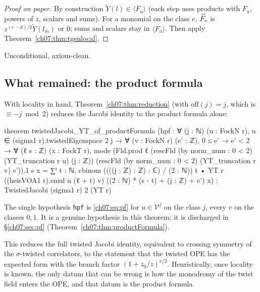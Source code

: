 \begin{proof}[Proof on paper]
By construction $\widetilde Y(l)\in\langle F_a\rangle$ (each step uses products with $F_a$, powers
of $z$, scalars and sums). For a monomial on the class $e$, $\widetilde{F}_e$ is $z^{(e-d)/2}
\widetilde Y(l_m)$ or $0$; sums and scalars stay in $\langle F_a\rangle$. Then apply
Theorem~\ref{ch07:thm:tgenlocal}.
\end{proof}

\begin{status}
Unconditional, axiom-clean.
\end{status}

\subsection{What remained: the product formula}

With locality in hand, Theorem~\ref{ch07:thm:reduction} (with $\mathrm{off}(j) = j$, which is
$\equiv -j \bmod 2$) reduces the Jacobi identity to the product formula alone:

\begin{leancode}
theorem twistedJacobi_YT_of_productFormula
    (hpf : ∀ (j : ℕ) (u : FockN r), u ∈ (sigma1 r).twistedEigenspace 2 j → ∀ (v : FockN r)
      (e' : ℤ), 0 ≤ e' → e' < 2 → ∀ (ℓ s : ℤ) (x : FockT r),
      mode (Fld.prod ℓ (rescFld (by norm_num : 0 < 2) (YT_truncation r u) (j : ℤ))
          (rescFld (by norm_num : 0 < 2) (YT_truncation r v) e')).1 s x
        = ∑ᶠ t : ℕ, cbinom ((((j : ℤ) : ℤ) : ℂ) / (2 : ℕ)) t •
            YT r ((heisVOA1 r).smul u (ℓ + t) v) ((2 : ℕ) * (s - t) + (j : ℤ) + e') x) :
    TwistedJacobi (sigma1 r) 2 (YT r)
\end{leancode}

\begin{dictionary}
The single hypothesis \verb|hpf| is \eqref{ch07:eq:pf} for $u\in\mathcal V^j$ on the class $j$,
every $v$ on the classes $0,1$. It is a genuine hypothesis in this theorem; it is discharged in
\S\ref{ch07:sec:pf} (Theorem~\ref{ch07:thm:productFormula}).
\end{dictionary}

\begin{physics}
This reduces the full twisted Jacobi identity, equivalent to crossing symmetry of the $\sigma$-twisted correlators, to the statement that the twisted OPE has the expected form with the branch factor $(1+z_0/z)^{e/2}$. Heuristically, once locality is known, the only datum that can be wrong is how the monodromy of the twist field enters the OPE, and that datum is the product formula.
\end{physics}

